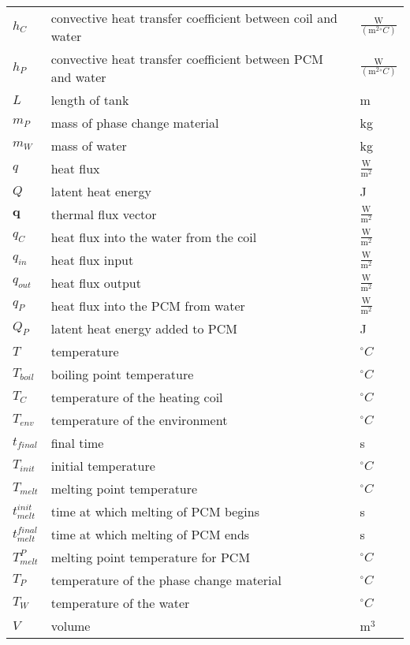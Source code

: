 \documentclass[12pt]{article}
\begin{document}
\begin{longtable*}{l l l}
\\
$h_{C}$ & convective heat transfer coefficient between coil and water & $\frac{\text{W}}{(\text{m}^{2}{}^{\circ}C)}$
\\
$h_{P}$ & convective heat transfer coefficient between PCM and water & $\frac{\text{W}}{(\text{m}^{2}{}^{\circ}C)}$
\\
$L$ & length of tank & m
\\
$m_{P}$ & mass of phase change material & kg
\\
$m_{W}$ & mass of water & kg
\\
$q$ & heat flux & $\frac{\text{W}}{\text{m}^{2}}$
\\
$Q$ & latent heat energy & J
\\
$\mathbf{q}$ & thermal flux vector & $\frac{\text{W}}{\text{m}^{2}}$
\\
$q_{C}$ & heat flux into the water from the coil & $\frac{\text{W}}{\text{m}^{2}}$
\\
$q_{in}$ & heat flux input & $\frac{\text{W}}{\text{m}^{2}}$
\\
$q_{out}$ & heat flux output & $\frac{\text{W}}{\text{m}^{2}}$
\\
$q_{P}$ & heat flux into the PCM from water & $\frac{\text{W}}{\text{m}^{2}}$
\\
$Q_{P}$ & latent heat energy added to PCM & J
\\
$T$ & temperature & ${}^{\circ}C$
\\
$T_{boil}$ & boiling point temperature & ${}^{\circ}C$
\\
$T_{C}$ & temperature of the heating coil & ${}^{\circ}C$
\\
$T_{env}$ & temperature of the environment & ${}^{\circ}C$
\\
$t_{final}$ & final time & s
\\
$T_{init}$ & initial temperature & ${}^{\circ}C$
\\
$T_{melt}$ & melting point temperature & ${}^{\circ}C$
\\
$t_{melt}^{init}$ & time at which melting of PCM begins & s
\\
$t_{melt}^{final}$ & time at which melting of PCM ends & s
\\
$T_{melt}^{P}$ & melting point temperature for PCM & ${}^{\circ}C$
\\
$T_{P}$ & temperature of the phase change material & ${}^{\circ}C$
\\
$T_{W}$ & temperature of the water & ${}^{\circ}C$
\\
$V$ & volume & $\text{m}^{3}$

\end{longtable*}
\end{document}
